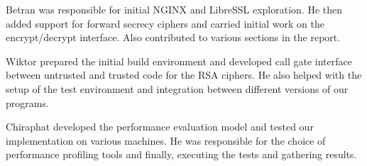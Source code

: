 \documentclass[../main.tex]{subfiles}
\begin{document}
Betran was responsible for initial NGINX and LibreSSL exploration. He then
added support for forward secrecy ciphers and carried initial work on the
encrypt/decrypt interface. Also contributed to various sections in the report. 

Wiktor prepared the initial build environment and developed call gate interface
between untrusted and trusted code for the RSA ciphers. He also helped with
the setup of the test environment and integration between different versions
of our programs.

Chiraphat developed the performance evaluation model and tested our
implementation on various machines. He was responsible for the choice of
performance profiling tools and finally, executing the tests and gathering
results.
\end{document}
